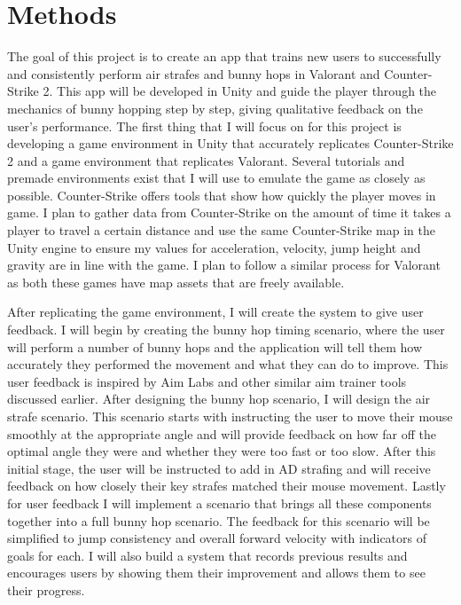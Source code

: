 \documentclass[10pt,twocolumn]{article}
\begin{document}
\section{Methods}

The goal of this project is to create an app that trains new users to successfully and consistently perform air strafes and bunny hops in Valorant and Counter-Strike 2. This app will be developed in Unity and guide the player through the mechanics of bunny hopping step by step, giving qualitative feedback on the user's performance. The first thing that I will focus on for this project is developing a game environment in Unity that accurately replicates Counter-Strike 2 and a game environment that replicates Valorant. Several tutorials and premade environments exist that I will use to emulate the game as closely as possible. Counter-Strike offers tools that show how quickly the player moves in game. I plan to gather data from Counter-Strike on the amount of time it takes a player to travel a certain distance and use the same Counter-Strike map in the Unity engine to ensure my values for acceleration, velocity, jump height and gravity are in line with the game. I plan to follow a similar process for Valorant as both these games have map assets that are freely available. 

After replicating the game environment, I will create the system to give user feedback. I will begin by creating the bunny hop timing scenario, where the user will perform a number of bunny hops and the application will tell them how accurately they performed the movement and what they can do to improve. This user feedback is inspired by Aim Labs and other similar aim trainer tools discussed earlier. After designing the bunny hop scenario, I will design the air strafe scenario. This scenario starts with instructing the user to move their mouse smoothly at the appropriate angle and will provide feedback on how far off the optimal angle they were and whether they were too fast or too slow. After this initial stage, the user will be instructed to add in AD strafing and will receive feedback on how closely their key strafes matched their mouse movement. Lastly for user feedback I will implement a scenario that brings all these components together into a full bunny hop scenario. The feedback for this scenario will be simplified to jump consistency and overall forward velocity with indicators of goals for each. I will also build a system that records previous results and encourages users by showing them their improvement and allows them to see their progress.
\end{document}
